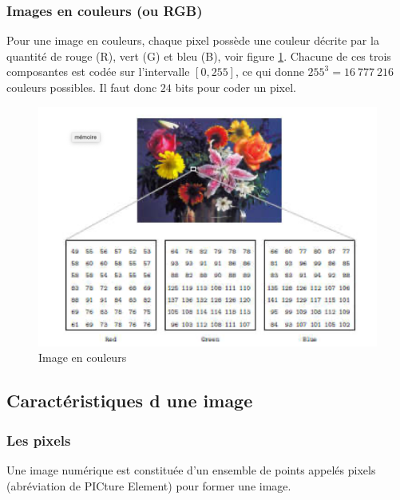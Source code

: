 \documentclass[a4paper,12pt]{report}
\begin{document}
\subsubsection{Images en couleurs (ou RGB)}
Pour une image en couleurs, chaque pixel possède une couleur décrite par la quantité de rouge (R), vert (G) et bleu (B), voir figure \ref{fig:ImageCouleur}. Chacune de ces trois composantes est codée sur l'intervalle $[0,255]$, ce qui donne $255^3= 16~777~216$ couleurs possibles. Il faut donc $24$ bits pour coder un pixel. 
\begin{figure}[!ht]
	\centering
	\includegraphics[scale=0.5]{ImageCouleur}
	\caption{Image en couleurs} \label{fig:ImageCouleur}
\end{figure}

\subsection{Caractéristiques d une image}
\subsubsection{Les pixels}
Une image numérique est constituée d’un ensemble de points appelés pixels (abréviation de PICture Element) pour former une image.
\end{document}
